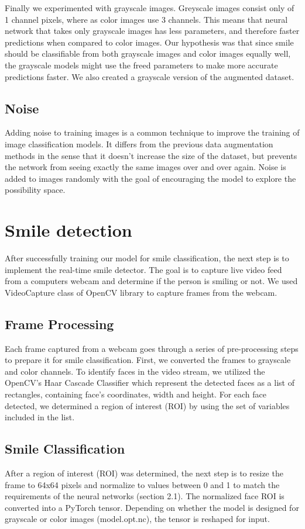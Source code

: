 \documentclass[12pt,a4paper,english
]{tunithesis}
\begin{document}
Finally we experimented with grayscale images. Greyscale images consist only of 1 channel pixels, where as color images use 3 channels. This means that neural network that takes only grayscale images has less parameters, and therefore faster predictions when compared to color images. Our hypothesis was that since smile should be classifiable from both grayscale images and color images equally well, the grayscale models might use the freed parameters to make more accurate predictions faster. We also created a grayscale version of the augmented dataset.

\subsection{Noise}
Adding noise to training images is a common technique to improve the training of image classification models. It differs from the previous data augmentation methods in the sense that it doesn't increase the size of the dataset, but prevents the network from seeing exactly the same images over and over again. Noise is added to images randomly with the goal of encouraging the model to explore the possibility space.\cite{dlbook}

\section{Smile detection}
After successfully training our model for smile classification, the next step is to implement the real-time smile detector. The goal is to capture live video feed from a computers webcam and determine if the person is smiling or not. We used VideoCapture class of OpenCV library to capture frames from the webcam. 

\subsection{Frame Processing}
Each frame captured from a webcam goes through a series of pre-processing steps to prepare it for smile classification. First, we converted the frames to grayscale and color channels. To identify faces in the video stream, we utilized the OpenCV's Haar Cascade Classifier which represent the detected faces as a list of rectangles, containing face's coordinates, width and height. For each face detected, we determined a region of interest (ROI) by using the set of variables included in the list.

\subsection{Smile Classification}
After a region of interest (ROI) was determined, the next step is to resize the frame to 64x64 pixels and normalize to values between 0 and 1 to match the requirements of the neural networks (section 2.1). The normalized face ROI is converted into a PyTorch tensor. Depending on whether the model is designed for grayscale or color images (model.opt.nc), the tensor is reshaped for input.
\end{document}
